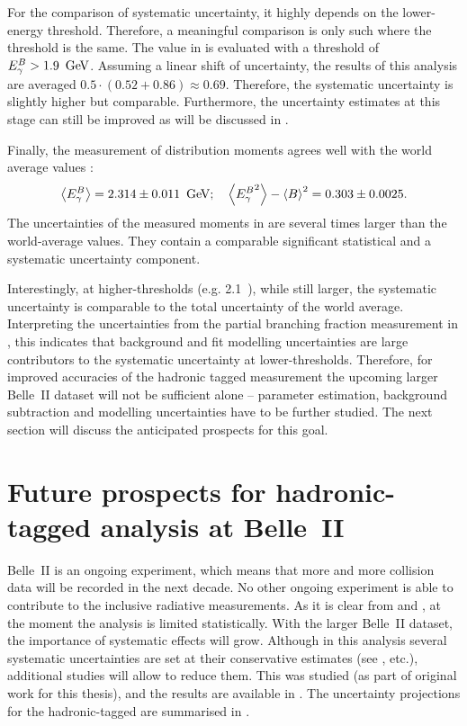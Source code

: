 For the comparison of systematic uncertainty, it highly depends on the lower-\EB energy threshold.
Therefore, a meaningful comparison is only such where the \EB threshold is the same.
The value in  is evaluated with a threshold of ${E^B_{\gamma}}>1.9~\mathrm{\,Ge\kern -0.1em V}$.
Assuming a linear shift of uncertainty, the results of this analysis are averaged $0.5\cdot(0.52+0.86)\approx0.69$.
Therefore, the systematic uncertainty is slightly higher but comparable.
Furthermore, the uncertainty estimates at this stage can still be improved as will be discussed in .

Finally, the measurement of \EB distribution moments agrees well with the world average values \cite{Workman:2022ynf}:
\begin{equation}
    \expval{\EB} = 2.314 \pm 0.011 ~\gev; \quad \expval{\EB^2} - \expval{\B}^2 = 0.303 \pm 0.0025.
\end{equation}
The uncertainties of the measured moments in  are several times larger than the world-average values.
They contain a comparable significant statistical and a systematic uncertainty component.

Interestingly, at higher-\EB thresholds (e.g. 2.1~\gev), while still larger, the systematic uncertainty is comparable to the total uncertainty of the world average.
Interpreting the uncertainties from the partial branching fraction measurement in , this indicates that background and fit modelling uncertainties are large contributors to the systematic uncertainty at lower-\EB thresholds.
Therefore, for improved accuracies of the hadronic tagged measurement
the upcoming larger Belle~II dataset will not be sufficient alone --
parameter estimation, background subtraction and modelling uncertainties have to be further studied.
The next section will discuss the anticipated prospects for this goal.

\section{Future prospects for hadronic-tagged \safeBtoXsgamma analysis at Belle~II}\label{sec:future_prospects}

Belle~II is an ongoing experiment, which means that more and more \epem collision data will be recorded in the next decade.
No other ongoing experiment is able to contribute to the inclusive radiative measurements.
As it is clear from  and , at the moment the analysis is limited statistically.
With the larger Belle~II dataset, the importance of systematic effects will grow.
Although in this analysis several systematic uncertainties are set at their conservative estimates (see ,  etc.),
additional studies will allow to reduce them.
This was studied (as part of original work for this thesis), and the results are available in \cite{Belle-II:2022cgf}.
The uncertainty projections for the hadronic-tagged \BtoXsgamma are summarised in .

